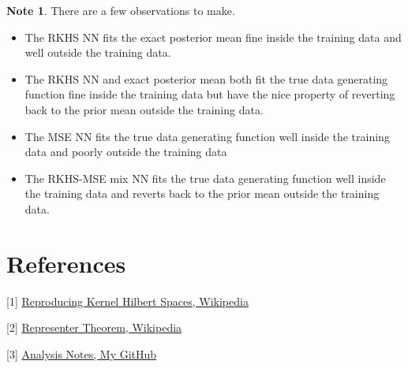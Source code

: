 \documentclass{article}
\theoremstyle{definition}
\newtheorem{note}[definition]{Note}
\begin{document}
\begin{note}
There are a few observations to make. 
\begin{itemize}
\item The RKHS NN fits the exact posterior mean fine inside the training data and well outside the training data.
\item The RKHS NN and exact posterior mean both fit the true data generating function fine inside the training data but have the nice property of reverting back to the prior mean outside the training data.
\item The MSE NN fits the true data generating function well inside the training data and poorly outside the training data  
\item The RKHS-MSE mix NN fits the true data generating function well inside the training data and reverts back to the prior mean outside the training data.
\end{itemize}
\end{note}





\section*{References}



[1] \href{https://en.wikipedia.org/wiki/Reproducing_kernel_Hilbert_space}{Reproducing Kernel Hilbert Spaces, Wikipedia}

[2] \href{https://en.wikipedia.org/wiki/Representer_theorem}{Representer Theorem, Wikipedia}

[3] \href{https://github.com/carsonaj/Mathematics/blob/master/Introduction\%20to\%20Analysis/Introduction\%20to\%20Analysis.pdf}{Analysis Notes, My GitHub}
\end{document}

